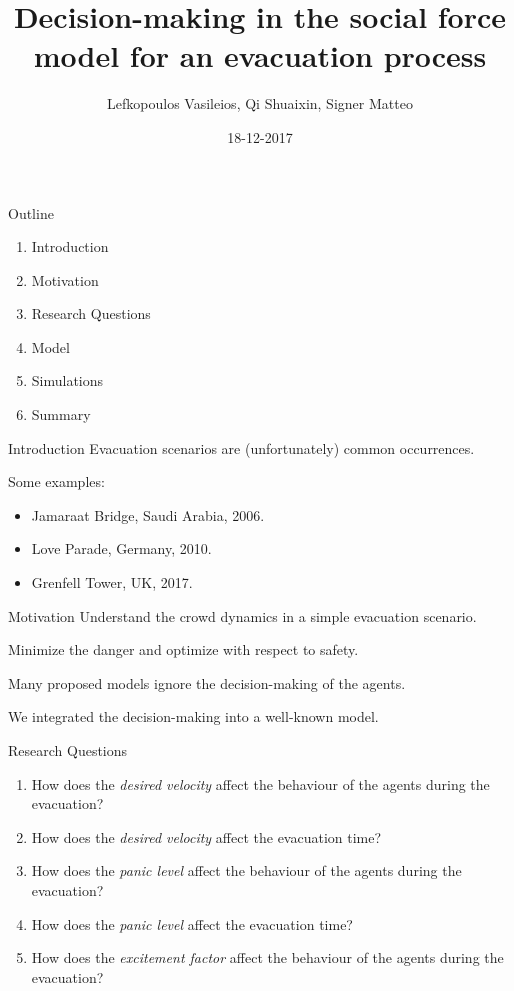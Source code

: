 \documentclass[aspectratio=43]{beamer}
\author[LQS]{Lefkopoulos Vasileios, Qi Shuaixin, Signer Matteo}
\title{Decision-making in the social force model for an evacuation process}
\date{18-12-2017}
\begin{document}
\titleframe


\begin{frame}{Outline}
	\begin{enumerate}
		\item Introduction
		
		\item Motivation
		
		\item Research Questions
		
		\item Model
		
		\item Simulations
		
		\item Summary
	\end{enumerate}
\end{frame}


\begin{frame}{Introduction}
	Evacuation scenarios are (unfortunately) common occurrences.
	
	\quad
	
	Some examples:
	\begin{itemize}
		\item Jamaraat Bridge, Saudi Arabia, 2006.
		\item Love Parade, Germany, 2010.
		\item Grenfell Tower, UK, 2017.
	\end{itemize}
\end{frame}


\begin{frame}{Motivation}
	Understand the crowd dynamics in a simple evacuation scenario.
	
	\quad
	
	Minimize the danger and optimize with respect to safety.
	
	\quad
	
	Many proposed models ignore the decision-making of the agents.
	
	\quad
	
	We integrated the decision-making into a well-known model.
\end{frame}


\begin{frame}{Research Questions}
	\begin{enumerate}
		\item How does the \emph{desired velocity} affect the behaviour of the agents during the evacuation?
		\smallskip
		\item How does the \emph{desired velocity} affect the evacuation time?
		\smallskip
		\item How does the \emph{panic level} affect the behaviour of the agents during the evacuation?
		\smallskip
		\item How does the \emph{panic level} affect the evacuation time?
		\smallskip
		\item How does the \emph{excitement factor} affect the behaviour of the agents during the evacuation?
	\end{enumerate}
\end{frame}
\end{document}
